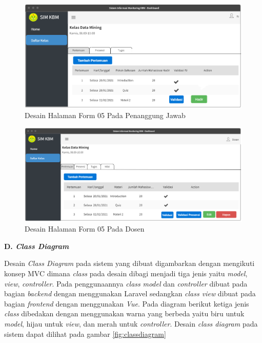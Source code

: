 \begin{figure}[h!]
	\centering
	\includegraphics[width=1\textwidth]{gambar/mockup/form05_pj}
	\caption{Desain Halaman Form 05 Pada Penanggung Jawab}
	\label{fig:form05pj}
\end{figure}

\begin{figure}[h!]
	\centering
	\includegraphics[width=1\textwidth]{gambar/mockup/form05_dosen}
	\caption{Desain Halaman Form 05 Pada Dosen }
	\label{fig:form05dosen}
\end{figure}


\textbf{D. \textit{Class Diagram}}

	Desain \textit{Class Diagram} pada sistem yang dibuat digambarkan dengan mengikuti konsep MVC dimana \textit{class} pada desain dibagi menjadi tiga jenis yaitu \textit{model}, \textit{view}, \textit{controller}. Pada penggunaannya \textit{class} \textit{model} dan \textit{controller} dibuat pada bagian \textit{backend} dengan menggunakan Laravel sedangkan \textit{class view} dibuat pada bagian \textit{frontend} dengan menggunakan \textit{Vue}. Pada diagram berikut ketiga jenis \textit{class} dibedakan dengan menggunakan warna yang berbeda yaitu biru untuk \textit{model}, hijau untuk \textit{view}, dan merah untuk \textit{controller}. Desain \textit{class diagram} pada sistem dapat dilihat pada gambar \ref{fig:classdiagram}


